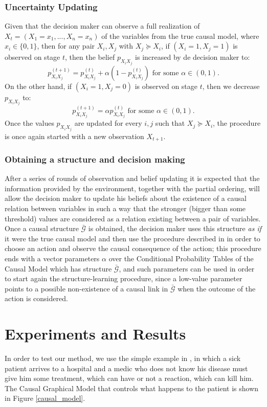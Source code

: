 \documentclass[letterpaper]{article}
\begin{document}
\subsubsection{Uncertainty Updating}
Given that the decision maker can observe a full realization of $X_t=(X_1=x_1,...,X_n=x_n)$ of the variables from the true causal model, where $x_i \in \{0,1 \}$, then for any pair $X_i,X_j$ with $X_j \succeq X_i$, if $(X_i=1, X_j=1)$ is observed on stage $t$, then the belief $p_{X_i X_j}$ is increased by de decision maker to:
\[  p_{X_i X_j}^{(t+1)} = p_{X_i X_j}^{(t)}+\alpha (1-p_{X_i X_j}^{(t)}) \textrm{ for some } \alpha \in (0,1).  \]
On the other hand, if $(X_i=1, X_j=0)$ is observed on stage $t$, then we decrease $p_{X_i X_j}$ to:
\[ p_{X_i X_j}^{(t+1)} =   \alpha p_{X_i X_j}^{(t)}  \textrm{ for some } \alpha \in (0,1). \]
Once the values  $p_{X_i X_j}$ are updated for every $i,j$ such that $X_j \succeq X_i$, the procedure is once again started with a new observation $X_{t+1}$.
\subsubsection{Obtaining a structure and decision making}
After a series of rounds of observation and belief updating it is expected that the information provided by the environment, together with the partial ordering, will allow the decision maker to update his beliefs about the existence of a causal relation between variables in such a way that the stronger (bigger than some threshold) values are considered as a relation existing between a pair of variables. Once a causal structure $\bar{\mathcal{G}}$ is obtained, the decision maker uses this structure \textit{as if} it were the true causal model and then use the procedure described in \cite{gonzalez2018playing} in order to choose an action and observe the causal consequence of the action; this procedure ends with a vector parameters $\alpha$ over the Conditional Probability Tables of the Causal Model which has structure $\bar{\mathcal{G}}$, and such parameters can be used in order to start again the structure-learning procedure, since a low-value parameter points to a possible non-existence of a causal link in $\bar{\mathcal{G}}$ when the outcome of the action is considered.

\section{Experiments and Results}
In order to test our method, we use the simple example in \cite{gonzalez2018playing}, in which a sick patient arrives to a hospital and a medic who does not know his disease must give him some treatment, which can have or not a reaction, which can kill him. The Causal Graphical Model that controls what happens to the patient is shown in Figure \ref{causal_model}.
\end{document}
